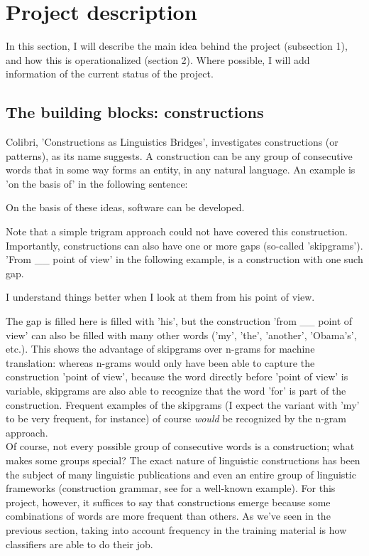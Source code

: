 \documentclass[12pt]{article}
\begin{document}
\section{Project description}

In this section, I will describe the main idea behind the project (subsection 1), and how this is operationalized (section 2). Where possible, I will add information of the current status of the project.

\subsection{The building blocks: constructions}

Colibri, 'Constructions as Linguistics Bridges', investigates constructions (or patterns), as its name suggests. A construction can be any group of consecutive words  that in some way forms an entity, in any natural language. An example is 'on the basis of' in the following sentence:

\begin{examples}
\item On the basis of these ideas, software can be developed.
\end{examples}

Note that a simple trigram approach could not have covered this construction. Importantly, constructions can also have one or more gaps (so-called 'skipgrams'). 'From \_\_ point of view' in the following example, is a construction with one such gap. 

\begin{examples}
\item I understand things better when I look at them from his point of view.
\end{examples}

The gap is filled here is filled with 'his', but the construction 'from \_\_ point of view' can also be filled with many other words ('my', 'the', 'another', 'Obama's', etc.). This shows the advantage of skipgrams over n-grams for machine translation: whereas n-grams would only have been able to capture the construction 'point of view', because the word directly before 'point of view' is variable, skipgrams are also able to recognize that the word 'for' is part of the construction. Frequent examples of the skipgrams (I expect the variant with 'my' to be very frequent, for instance) of course \emph{would} be recognized by the n-gram approach.\\\indent
Of course, not every possible group of consecutive words is a construction; what makes some groups special? The exact nature of linguistic constructions has been the subject of many linguistic publications and even an entire group of linguistic frameworks (construction grammar, see \citet{goldberg95} for a well-known example). For this project, however, it suffices to say that constructions emerge because some combinations of words are more frequent than others. As we've seen in the previous section, taking into account frequency in the training material is how classifiers are able to do their job.
\end{document}
